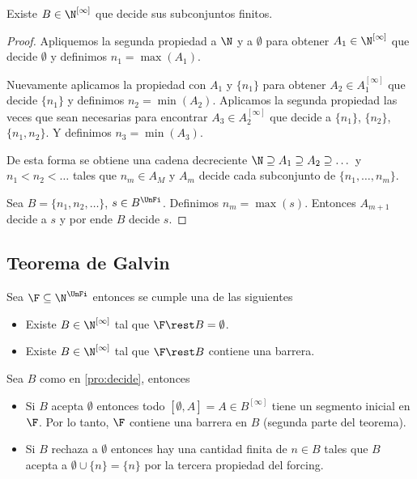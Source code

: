 \begin{pro}\label{pro:decide}
    Existe $B \in \N^{[\infty]}$ que decide sus subconjuntos finitos.
\end{pro}

\begin{proof}
    Apliquemos la segunda propiedad a $\N$ y a $\emptyset$ para obtener $A_1 \in \N^{[\infty]}$ que decide $\emptyset$ y definimos $n_1 = \max(A_1)$.
        
    Nuevamente aplicamos la propiedad con $A_1$ y $\{n_1\}$ para obtener $A_2 \in A_1^{[\infty]}$ que decide $\{n_1\}$ y definimos $n_2 =\min(A_2)$. Aplicamos la segunda propiedad las veces que sean necesarias para encontrar $A_3 \in A_2^{[\infty]}$ que decide a $\{n_1\}$, $\{n_2\}$, $\{n_1, n_2\}$. Y definimos $n_3 = \min(A_3)$.
        
    De esta forma se obtiene una cadena decreciente $\N \supseteq A_1 \supseteq A_2 \supseteq \dots$ y $n_1 < n_2 < \dots$ tales que $n_m \in A_M$ y $A_m$ decide cada subconjunto de $\{n_1, \dots, n_m\}$.
    
    Sea $B = \{n_1, n_2, \dots\}$, $s \in B^{\UnFi}$. Definimos $n_m = \max(s)$. Entonces $A_{m+1}$ decide a $s$ y por ende $B$ decide $s$.
\end{proof}

\subsection{Teorema de Galvin}

\begin{teo}[Galvin]\label{teo:Galvin}
    Sea $\F \subseteq \N^{\UnFi}$ entonces se cumple una de las siguientes
    
    \begin{itemize}
        \item Existe $B \in \N^{[\infty]}$ tal que $\F \rest B = \emptyset$.
        \item Existe $B \in \N^{[\infty]}$ tal que $\F \rest B$ contiene una barrera.
    \end{itemize}
\end{teo}

\begin{teo}
    Sea $B$ como en \ref{pro:decide}, entonces
    
    \begin{itemize}
        \item Si $B$ acepta $\emptyset$ entonces todo $[\emptyset, A] = A \in B^{[\infty]}$ tiene un segmento inicial en $\F$. Por lo tanto, $\F$ contiene una barrera en $B$ (segunda parte del teorema).
        \item Si $B$ rechaza a $\emptyset$ entonces hay una cantidad finita de $n \in B$ tales que $B$ acepta a $\emptyset \cup \{n\} = \{n\}$ por la tercera propiedad del forcing.
    \end{itemize}
\end{teo}

